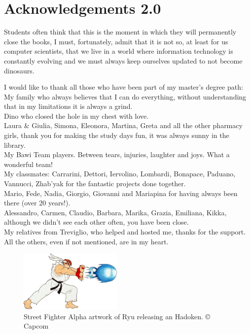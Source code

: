 %
%

\chapter*{Acknowledgements 2.0}

Students often think that this is the moment in which they will permanently close the books, I must, fortunately, admit that it is not so, at least for us computer scientists, that we live in a world where information technology is constantly evolving and we must always keep ourselves updated to not become dinosaurs.

I would like to thank all those who have been part of my master's degree path:\\
My family who always believes that I can do everything, without understanding that in my limitations it is always a grind.\\
Dino who closed the hole in my chest with love.\\
Laura \& Giulia, Simona, Eleonora, Martina, Greta and all the other pharmacy girls, thank you for making the study days fun, it was always sunny in the library.\\
My Bawi Team players. Between tears, injuries, laughter and joys. What a wonderful team!\\
My classmates: Carrarini, Dettori, Iervolino, Lombardi, Bonapace, Paduano, Vannucci, Zhab'yak for the fantastic projects done together.\\
Mario, Fede, Nadia, Giorgio, Giovanni and Mariapina for having always been there (over 20 years!).\\
Alessandro, Carmen, Claudio, Barbara, Marika, Grazia, Emiliana, Kikka, although we didn't see each other often, you have been close.\\
My relatives from Treviglio, who helped and hosted me, thanks for the support.\\
All the others, even if not mentioned, are in my heart.

\vspace*{\fill}

\begin{figure}[H]
	\centering
	\includegraphics[width=5cm]{immagini/hadoken}
	\caption{Street Fighter Alpha artwork of Ryu releasing an Hadoken. © Capcom}
	\label{fig:hadoken}
\end{figure}